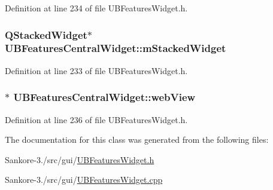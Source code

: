 Definition at line 234 of file U\-B\-Features\-Widget.\-h.

\hypertarget{class_u_b_features_central_widget_ada7c605148002a7663c245e465480f80}{
\subsubsection[{m\-Stacked\-Widget}]{\setlength{\rightskip}{0pt plus 5cm}Q\-Stacked\-Widget$\ast$ U\-B\-Features\-Central\-Widget\-::m\-Stacked\-Widget}}\label{da/d07/class_u_b_features_central_widget_ada7c605148002a7663c245e465480f80}


Definition at line 233 of file U\-B\-Features\-Widget.\-h.

\hypertarget{class_u_b_features_central_widget_a68e5fbe9c8c6fa56f1b0978ab88df5df}{
\subsubsection[{web\-View}]{$\ast$ U\-B\-Features\-Central\-Widget\-::web\-View}}\label{da/d07/class_u_b_features_central_widget_a68e5fbe9c8c6fa56f1b0978ab88df5df}


Definition at line 236 of file U\-B\-Features\-Widget.\-h.



The documentation for this class was generated from the following files\-:\begin{DoxyCompactItemize}
\item 
Sankore-\/3./src/gui/\hyperlink{_u_b_features_widget_8h}{U\-B\-Features\-Widget.\-h}\item 
Sankore-\/3./src/gui/\hyperlink{_u_b_features_widget_8cpp}{U\-B\-Features\-Widget.\-cpp}\end{DoxyCompactItemize}
